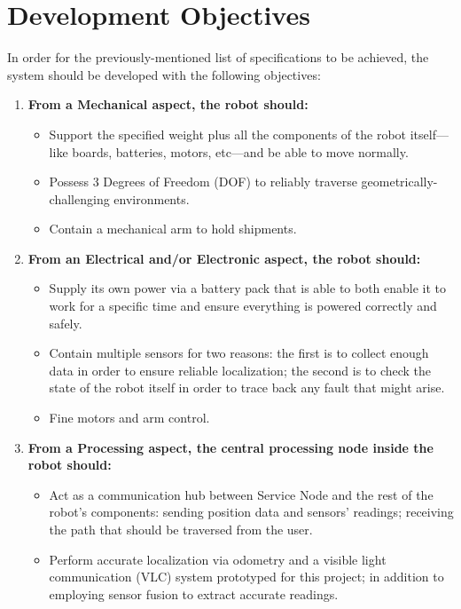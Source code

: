 \newpage

\section{Development Objectives}
In order for the previously-mentioned list of specifications to be achieved, the system should be developed with the following objectives:
\begin{enumerate}
    \item \textbf{From a Mechanical aspect, the robot should:}
            \begin{itemize}
                \item Support the specified weight plus all the components of the robot itself---like boards, batteries, motors, etc---and be able to move normally.
                \item Possess 3 Degrees of Freedom (DOF) to reliably traverse geometrically-challenging environments.
                \item Contain a mechanical arm to hold shipments.
            \end{itemize}
    \item \textbf{From an Electrical and/or Electronic aspect, the robot should:}
            \begin{itemize}
                \item Supply its own power via a battery pack that is able to both enable it to work for a specific time and ensure everything is powered correctly and safely.
                \item Contain multiple sensors for two reasons: the first is to collect enough data in order to ensure reliable localization; the second is to check the state of the robot itself in order to trace back any fault that might arise.
                \item Fine motors and arm control.
            \end{itemize}
    \item \textbf{From a Processing aspect, the central processing node inside the robot should:}
            \begin{itemize}
                \item Act as a communication hub between Service Node and the rest of the robot's components: sending position data and sensors' readings; receiving the path that should be traversed from the user.
                \item Perform accurate localization via odometry and a visible light communication (VLC) system prototyped for this project; in addition to employing sensor fusion to extract accurate readings.  

\end{itemize}
\end{enumerate}
